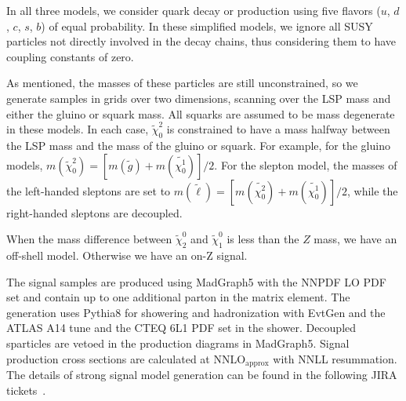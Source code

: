 In all three models, we consider quark decay or production using five flavors ($u$, $d$, $c$, $s$, $b$) of equal probability. In these simplified models, we ignore all SUSY particles not directly involved in the decay chains, thus considering them to have coupling constants of zero.

As mentioned, the masses of these particles are still unconstrained, so we generate samples in grids over two dimensions, scanning over the LSP mass and either the gluino or squark mass. All squarks are assumed to be mass degenerate in these models. In each case, $\tilde{\chi}_0^2$ is constrained to have a mass halfway between the LSP mass and the mass of the gluino or squark. For example, for the gluino models, $m(\tilde{\chi}_0^2) = [m(\tilde{g})+m(\tilde{\chi^1_0})]/2$. For the slepton model, the masses of the left-handed sleptons are set to $m(\tilde{\ell}) = [m(\tilde{\chi^2_0})+m(\tilde{\chi^1_0})]/2$, while the right-handed sleptons are decoupled.

When the mass difference between $\tilde{\chi}_{2}^{0}$ and $\tilde{\chi}_{1}^{0}$ is less than the $Z$ mass, we have an off-shell model. Otherwise we have an on-Z signal.

The signal samples are produced using MadGraph5 with the NNPDF LO PDF set and contain up to one additional parton in the matrix element. The generation uses Pythia8 for showering and hadronization with EvtGen and the ATLAS A14 tune and the CTEQ 6L1 PDF set in the shower. Decoupled sparticles are vetoed in the production diagrams in MadGraph5. Signal production cross sections are calculated at NNLO$_\text{approx}$ with NNLL resummation. The details of strong signal model generation can be found in the following JIRA tickets~\cite{JIRAGluinoSLN, JIRAGluinoZ, JIRASleptonZ}.